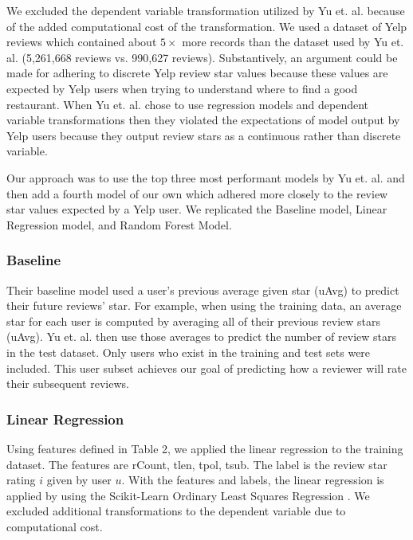 \documentclass[12pt]{article}
\begin{document}
We excluded the dependent variable transformation utilized by Yu et. al. \cite{yu2015restaurants}
because of the added computational cost of the transformation. We used a dataset of Yelp reviews
which contained about $5 \times$ more records than the dataset used by Yu et. al. \cite{yu2015restaurants} (5,261,668 reviews vs. 990,627 reviews). Substantively, an argument could be made for
adhering to discrete Yelp review star values because these values are expected by Yelp users
when trying to understand where to find a good restaurant. When Yu et. al. \cite{yu2015restaurants}
chose to use regression models and dependent variable transformations then they violated
the expectations of model output by Yelp users because they output review stars as a continuous
rather than discrete variable.

Our approach was to use the top three most performant models by Yu et. al. \cite{yu2015restaurants}
and then add a fourth model of our own which adhered more closely to the review star values
expected by a Yelp user. We replicated the Baseline model, Linear Regression model, and
Random Forest Model.

\subsubsection{Baseline}

Their baseline model used a user's previous average given star (uAvg) to predict their future
reviews' star. For example, when using the training data, an average star for each user
is computed by averaging all of their previous review stars (uAvg). Yu et. al.
\cite{yu2015restaurants} then use those averages to predict the number of review stars in the
test dataset. Only users who exist in the training and test sets were included. This user subset
achieves our goal of predicting how a reviewer will rate their subsequent reviews.

\subsubsection{Linear Regression}

Using features defined in Table 2, we applied the linear regression to the training dataset. The
features are rCount, tlen, tpol, tsub. The label is the review star rating $i$ given by
user $u$. With the features and labels, the linear regression is applied by using
the Scikit-Learn Ordinary Least Squares Regression \cite{sklearnl76:online}. We excluded
additional transformations to the dependent variable due to computational cost.
\end{document}
